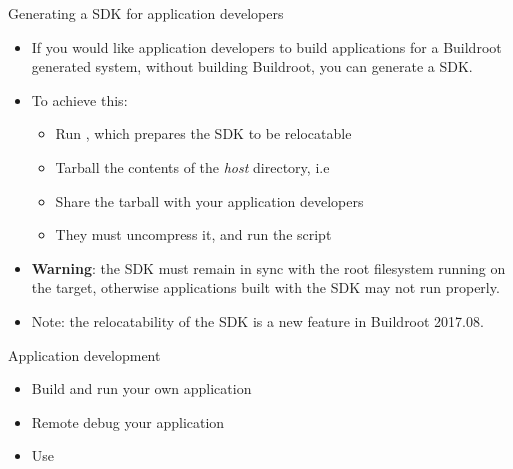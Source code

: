 \begin{frame}{Generating a SDK for application developers}
  \begin{itemize}
  \item If you would like application developers to build applications
    for a Buildroot generated system, without building Buildroot, you
    can generate a SDK.
  \item To achieve this:
    \begin{itemize}
    \item Run , which prepares the SDK to be
      relocatable
    \item Tarball the contents of the {\em host} directory, i.e
    \item Share the tarball with your application developers
    \item They must uncompress it, and run the 
      script
    \end{itemize}
  \item {\bf Warning}: the SDK must remain in sync with the root
    filesystem running on the target, otherwise applications built
    with the SDK may not run properly.
  \item Note: the relocatability of the SDK is a new feature in
    Buildroot 2017.08.
  \end{itemize}
\end{frame}

\setuplabframe
{Application development}
{
  \begin{itemize}
  \item Build and run your own application
  \item Remote debug your application
  \item Use 
  \end{itemize}
}
